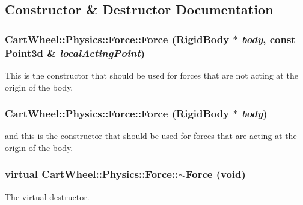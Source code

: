 \subsection{Constructor \& Destructor Documentation}
\hypertarget{classCartWheel_1_1Physics_1_1Force_a160fedc7c67205cfa932a8d1d800928e}{
\subsubsection[{Force}]{\setlength{\rightskip}{0pt plus 5cm}CartWheel::Physics::Force::Force ({\bf RigidBody} $\ast$ {\em body}, \/  const {\bf Point3d} \& {\em localActingPoint})}}
\label{classCartWheel_1_1Physics_1_1Force_a160fedc7c67205cfa932a8d1d800928e}
This is the constructor that should be used for forces that are not acting at the origin of the body. \hypertarget{classCartWheel_1_1Physics_1_1Force_abd3dad6fe06acd39ddba2b684d97aef2}{
\subsubsection[{Force}]{\setlength{\rightskip}{0pt plus 5cm}CartWheel::Physics::Force::Force ({\bf RigidBody} $\ast$ {\em body})}}
\label{classCartWheel_1_1Physics_1_1Force_abd3dad6fe06acd39ddba2b684d97aef2}
and this is the constructor that should be used for forces that are acting at the origin of the body. \hypertarget{classCartWheel_1_1Physics_1_1Force_ab1ad766d15b6ba1b4df8a365630bd447}{
\subsubsection[{$\sim$Force}]{\setlength{\rightskip}{0pt plus 5cm}virtual CartWheel::Physics::Force::$\sim$Force (void)}}
\label{classCartWheel_1_1Physics_1_1Force_ab1ad766d15b6ba1b4df8a365630bd447}
The virtual destructor. 

